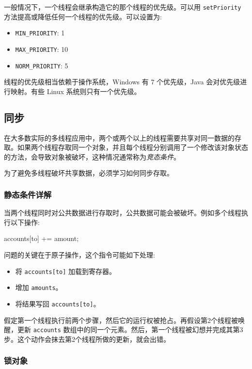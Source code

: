 一般情况下，一个线程会继承构造它的那个线程的优先级。可以用 \texttt{setPriority} 方法提高或降低任何一个线程的优先级。可以设置为:
\begin{itemize}
    \item \texttt{MIN\_PRIORITY}: 1
    \item \texttt{MAX\_PRIORITY}: 10
    \item \texttt{NORM\_PRIORITY}: 5
\end{itemize}

线程的优先级相当依赖于操作系统，Windows 有 7 个优先级，Java 会对优先级进行映射。有些 Linux 系统则只有一个优先级。

\subsection{同步}

在大多数实际的多线程应用中，两个或两个以上的线程需要共享对同一数据的存取。如果两个线程存取同一个对象，并且每个线程分别调用了一个修改该对象状态的方法，会导致对象被破坏，这种情况通常称为\textit{竞态条件}。

为了避免多线程破坏共享数据，必须学习如何同步存取。

\subsubsection{静态条件详解}

当两个线程同时对公共数据进行存取时，公共数据可能会被破坏。例如多个线程执行以下操作:

\begin{Java}
accounts[to] += amount;
\end{Java}

问题的关键在于原子操作，这个指令可能如下处理:
\begin{itemize}
    \item 将 \texttt{accounts[to]} 加载到寄存器。
    \item 增加 \texttt{amounts}。
    \item 将结果写回 \texttt{accounts[to]}。
\end{itemize}

假定第一个线程执行前两个步骤，然后它的运行权被抢占。再假设第2个线程被唤醒，更新 \texttt{accounts} 数组中的同一个元素。然后，第一个线程被幻想并完成其第3步。这个动作会抹去第2个线程所做的更新，就会出错。

\subsubsection{锁对象}

